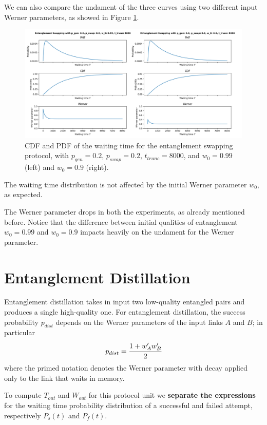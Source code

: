 \documentclass{masterthesis}
\begin{document}
We can also compare the undament of the three curves using two different input Werner parameters, as showed in Figure \ref{fig:swap_comparison}.

\begin{figure}[ht]
    \centering
    \includegraphics[width=1\linewidth]{images/swap_n3_comparison.png}
    \caption{CDF and PDF of the waiting time for the entanglement swapping protocol, with $p_{gen} = 0.2$, $p_{swap} = 0.2$, $t_{trunc} = 8000$, and $w_0 = 0.99$ (left) and $w_0 = 0.9$ (right).}
    \label{fig:swap_comparison}
\end{figure}

The waiting time distribution is not affected by the initial Werner parameter $w_0$, as expected.

The Werner parameter drops in both the experiments, as already mentioned before.
Notice that the difference between initial qualities of entanglement $w_0 = 0.99$ and $w_0 = 0.9$ impacts heavily on the undament for the Werner parameter.

\newpage
\section*{Entanglement Distillation}

Entanglement distillation takes in input two low-quality entangled pairs and produces a single high-quality one.
For entanglement distillation, the success probability $p_{dist}$ depends on the Werner parameters of the input links $A$ and $B$; in particular
\begin{equation}
    p_{dist} = \cfrac{1+w_A'w_B'}{2}
\end{equation}
where the primed notation denotes the Werner parameter with decay applied only to the link that waits in memory.

To compute $T_{out}$ and $W_{out}$ for this protocol unit we \textbf{separate the expressions} for the waiting time probability distribution of a successful and failed attempt, respectively $P_s(t)$ and $P_f(t)$.
\end{document}
